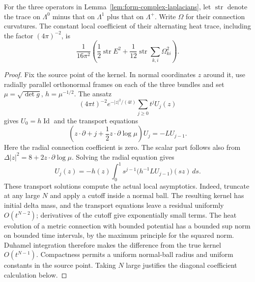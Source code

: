 \begin{lemma}
\label{lem:signed-heat-coefficient}
For the three operators in
Lemma~\ref{lem:form-complex-laplacians}, let $\operatorname{str}$
denote the trace on $\Lambda^0$ minus that on $\Lambda^1$ plus
that on $\Lambda^+$. Write $\Omega$ for their connection
curvatures. The constant local coefficient of their alternating
heat trace, including the factor $(4\pi)^{-2}$, is
\[
 \frac1{16\pi^2}
 \left(\frac12\operatorname{str}E^2
       +\frac1{12}\operatorname{str}\sum_{k,i}\Omega_{ki}^2\right).
\]
\end{lemma}

\begin{proof}
Fix the source point of the kernel. In normal coordinates
$z$ around it, use radially parallel orthonormal frames on
each of the three bundles and set
$\mu=\sqrt{\det g}$, $h=\mu^{-1/2}$. The ansatz
\[
 (4\pi t)^{-2}e^{-|z|^2/(4t)}
       \sum_{j\ge0}t^jU_j(z)
\]
gives $U_0=h\operatorname{Id}$ and the transport equations
\[
 \left(z\cdot\partial+j+\frac12z\cdot\partial\log\mu\right)U_j
 =-LU_{j-1}.
\]
Here the radial connection coefficient is zero.
The scalar part follows also from
$\Delta|z|^2=8+2z\cdot\partial\log\mu$.
Solving the radial equation gives
\[
 U_j(z)=-h(z)\int_0^1 s^{j-1}
                  \bigl(h^{-1}LU_{j-1}\bigr)(sz)\,ds.
\]
These transport solutions compute the actual local asymptotics.
Indeed, truncate at any large $N$ and apply a cutoff inside a
normal ball. The resulting kernel has initial delta mass,
and the transport equations leave a residual uniformly
$O(t^{N-2})$; derivatives of the cutoff give exponentially
small terms. The heat evolution of a metric connection
with bounded potential has a bounded sup norm on bounded
time intervals, by the maximum principle for the squared
norm. Duhamel integration therefore makes the difference
from the true kernel $O(t^{N-1})$. Compactness permits a
uniform normal-ball radius and uniform constants in the
source point. Taking $N$ large justifies the diagonal
coefficient calculation below.


\end{proof}
